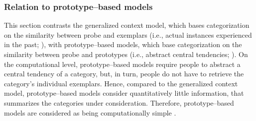 \documentclass[a4paper,man,natbib]{apa6}
\begin{document}
\subsubsection{Relation to prototype--based models}
This section contrasts the generalized context model, which bases categorization on the similarity between probe and exemplars (i.e., actual instances experienced in the past; \citealp{medin1978context, nosofsky1986attention}), with prototype--based models, which base categorization on the similarity between probe and prototypes (i.e., abstract central tendencies; \citealp{posner1968genesis}). 
On the computational level, prototype--based models require people to abstract a central tendency of a category, but, in turn, people do not have to retrieve the category's individual exemplars. Hence, compared to the generalized context model, prototype--based models consider quantitatively little information, that summarizes the categories under consideration. Therefore, prototype--based models are considered as being computationally simple \citep{smith1998prototypes}.
\end{document}
